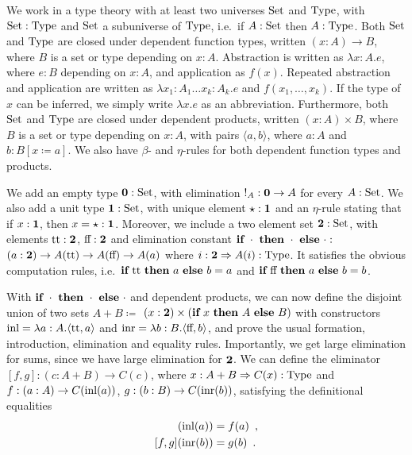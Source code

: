 \documentclass{article}
\begin{document}
We work in a type theory with at least two universes $\text{Set}$ and
$\text{Type}$, with $\text{Set} : \text{Type}$ and $\text{Set}$ a subuniverse of $\text{Type}$,
i.e.\ if $A : \text{Set}$ then $A : \text{Type}$. Both $\text{Set}$ and $\text{Type}$ are
closed under dependent function types, written $(x : A) \to B$, where
$B$ is a set or type depending on $x: A$. Abstraction is written as
$\lambda x : A . e$, where $e : B$ depending on $x : A$, and
application as $f(x)$. Repeated abstraction and application are
written as $\lambda x_1 : A_1 \ldots x_k : A_k . e$ and $f(x_1,
\ldots, x_k)$. If the type of $x$ can be inferred, we simply write
$\lambda x.e$ as an abbreviation.  Furthermore, both $\text{Set}$ and
$\text{Type}$ are closed under dependent products, written $(x : A) \times
B$, where $B$ is a set or type depending on $x: A$, with pairs
$\langle a , b \rangle$, where $a : A$ and $b : B[x \coloneqq a]$.
We also have $\beta$- and $\eta$-rules for both dependent function types
and products.

We add an empty type $\mathbf{0} : \text{Set}$, with elimination ${!_A : \mathbf{0}
  \to A}$ for every $A : \text{Set}$. We also add a unit type $\mathbf{1} : \text{Set}$,
with unique element $\star : \mathbf{1}$ and an $\eta$-rule stating that
if $x : \mathbf{1}$, then $x = \star : \mathbf{1}$. Moreover, we include a two
element set $\mathbf{2} : \text{Set}$, with elements $\text{tt} : \mathbf{2}$, $\text{ff} :
\mathbf{2}$ and elimination constant $\textbf{if}~\cdot~\textbf{then}~\cdot~\textbf{else}~\cdot :$
$(a : \mathbf{2}) \to A(\text{tt}) \to A(\text{ff}) \to A(a)$ where $i : \mathbf{2}
\Rightarrow A(i) : \text{Type}$. It satisfies the obvious computation
rules, i.e.\ $\textbf{if}~\text{tt}~\textbf{then}~a~\textbf{else}~b = a$ and
$\textbf{if}~\text{ff}~\textbf{then}~a~\textbf{else}~b = b$.

With $\textbf{if}~\cdot~\textbf{then}~\cdot~\textbf{else}~\cdot$ and dependent products, we can now
define the disjoint union of two sets $A + B \coloneqq$ ${(x : \mathbf{2})}
\times (\textbf{if}~x~\textbf{then}~A~\textbf{else}~B)$ with constructors $\text{inl} = \lambda {a :
  A} . \langle \text{tt} , a \rangle$ and $\text{inr} = \lambda {b : B}
. \langle \text{ff} , b \rangle$, and prove the usual formation,
introduction, elimination and equality rules. Importantly, we get
large elimination for sums, since we have large elimination for
$\mathbf{2}$. We can define the eliminator ${[f, g] : {(c : A + B)} \to C(c)}$, where
$x : A + B \Rightarrow C(x) : \text{Type}$ and $f : (a : A) \to C(\text{inl}(a))$,
$g : (b : B) \to C(\text{inr}(b))$, satisfying the definitional equalities
\begin{align*}
[f, g](\inl(a)) &= f(a) \enspace , \\
[f, g](\inr(b)) &= g(b) \enspace .
\end{align*}
\end{document}
